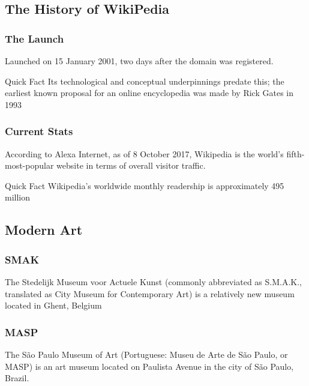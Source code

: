 \subsection{The History of WikiPedia}


\begin{frame}
	\frametitle{The Launch}
	Launched on 15 January 2001, two days after the domain was registered.
	\begin{block}{Quick Fact}
		Its technological and conceptual underpinnings predate this; the earliest known proposal for an online encyclopedia was made by Rick Gates in 1993
	\end{block}
\end{frame}


\begin{frame}
	\frametitle{Current Stats}
	According to Alexa Internet, as of 8 October 2017, Wikipedia is the world's fifth-most-popular website in terms of overall visitor traffic.

	\begin{block}{Quick Fact}
		Wikipedia's worldwide monthly readership is approximately 495 million
	\end{block}
\end{frame}


\subsection{Modern Art}


\begin{frame}
	\frametitle{SMAK}
	The Stedelijk Museum voor Actuele Kunst (commonly abbreviated as S.M.A.K., translated as City Museum for Contemporary Art) is a relatively new museum located in Ghent, Belgium
\end{frame}



\begin{frame}
	\frametitle{MASP}
	The São Paulo Museum of Art (Portuguese: Museu de Arte de São Paulo, or MASP) is an art museum located on Paulista Avenue in the city of São Paulo, Brazil.
\end{frame}
